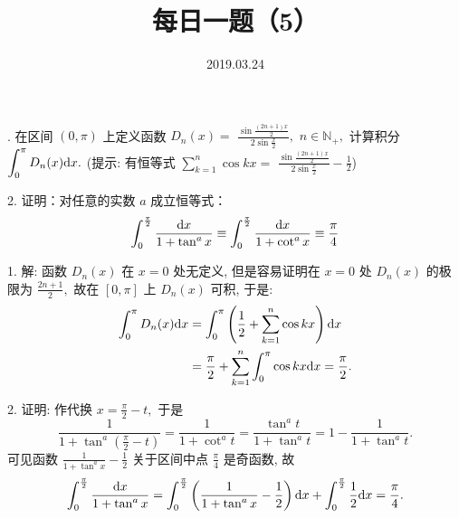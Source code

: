 \documentclass[UTF8]{ctexart}
\title{\textbf{每日一题（5）}}
\date{2019.03.24}
\begin{document}
. 在区间 $(0,\pi)$ 上定义函数 $D_n(x)=$ $\displaystyle \frac{\sin \displaystyle \frac{(2n+1)x}{2}}{2\sin \displaystyle \frac{x}{2}},$ $n \in \mathbb{N}_+,$ 计算积分 $\displaystyle \int_{0}^{\pi}D_n(x){\rm d}x.$ (提示: 有恒等式 $\displaystyle \sum_{k=1}^{n}\cos kx=$ $\displaystyle \frac{\sin \displaystyle \frac{(2n+1)x}{2}}{2\sin \displaystyle \frac{x}{2}}-\frac{1}{2}$)

2. 证明：对任意的实数 $a$ 成立恒等式：
\[
\int_{0}^{\frac{\pi}{2}}\frac{{\rm d}x}{1+\tan^ax} \equiv \int_{0}^{\frac{\pi}{2}}\frac{{\rm d}x}{1+\cot^ax} \equiv \frac{\pi}{4}
\]

1. 解: 函数 $D_n(x)$ 在 $x=0$ 处无定义, 但是容易证明在 $x=0$ 处 $D_n(x)$ 的极限为 $\displaystyle \frac{2n+1}{2},$ 故在 $[0,\pi]$ 上 $D_n(x)$ 可积, 于是:
\begin{align*}
  \int_{0}^{\pi}D_n(x){\rm d}x&=\int_{0}^{\pi}\left(\frac{1}{2}+\sum_{k=1}^{n}\cos kx\right){\rm d}x \\
                              &=\frac{\pi}{2}+\sum_{k=1}^{n}\int_{0}^{\pi}\cos kx{\rm d}x=\frac{\pi}{2}.
\end{align*}

2. 证明: 作代换 $x=\displaystyle \frac{\pi}{2}-t,$ 于是
\[
\frac{1}{1+\tan^a\left(\displaystyle \frac{\pi}{2}-t\right)}=\frac{1}{1+\cot^a t}=\frac{\tan^at}{1+\tan^at}=1-\frac{1}{1+\tan^at}.
\]
可见函数 $\displaystyle \frac{1}{1+\tan^ax}-\displaystyle \frac{1}{2}$ 关于区间中点 $\displaystyle \frac{\pi}{4}$ 是奇函数, 故
\[
\int_{0}^{\frac{\pi}{2}}\frac{{\rm d}x}{1+\tan^ax}=\int_{0}^{\frac{\pi}{2}}\left(\frac{1}{1+\tan^ax}-\displaystyle\frac{1}{2}\right){\rm d}x+\int_{0}^{\frac{\pi}{2}}\displaystyle\frac{1}{2}{\rm d}x=\displaystyle\frac{\pi}{4}.
\]
\end{document}
